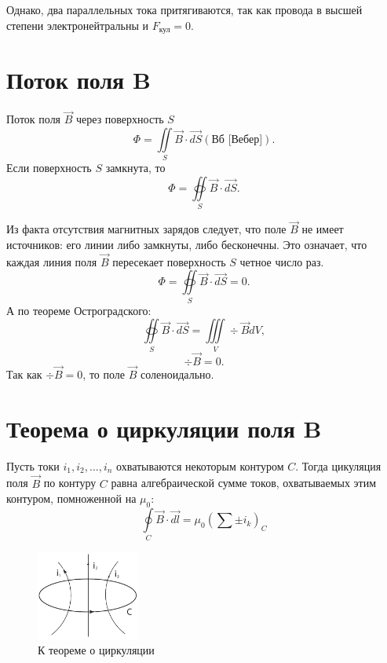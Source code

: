     Однако, два параллельных тока притягиваются, так как провода в высшей
    степени электронейтральны и \( F_\textit{кул} = 0 \).
    
\section{Поток поля \textbf{B}}
    Поток поля \( \vec{B} \) через поверхность \( S \)
    \[
        \Phi = \iint\limits_S \vec{B}\cdot\vec{dS} (\text{Вб [Вебер]}).
    \]
    Если поверхность \( S \) замкнута, то
    \[
        \Phi = \oiint\limits_S \vec{B}\cdot\vec{dS}.
    \]
    
    Из факта отсутствия магнитных зарядов следует, что поле \( \vec{B} \) не
    имеет источников: его линии либо замкнуты, либо бесконечны. Это означает,
    что каждая линия поля \( \vec{B} \) пересекает поверхность \( S \) четное
    число раз.
    \[
        \Phi = \oiint\limits_S \vec{B}\cdot\vec{dS} = 0.
    \]
    А по теореме Остроградского:
    \[
        \oiint\limits_S \vec{B}\cdot\vec{dS} = \iiint\limits_V \div\vec{B}dV,
    \]
    \[
        \div\vec{B} = 0.
    \]
     Так как \( \div\vec{B} = 0 \), то поле \( \vec{B} \) соленоидально.
     
\section{Теорема о циркуляции поля \textbf{B}}
    \begin{theorem}
        Пусть токи \( i_1, i_2, \ldots, i_n \) охватываются некоторым контуром
        \( C \). Тогда цикуляция поля \( \vec{B} \) по контуру \( C \) равна
        алгебраической сумме токов, охватываемых этим контуром, помноженной на
        \( \mu_0 \):
        \begin{equation}
            \oint\limits_C \vec{B}\cdot\vec{dl} = \mu_0 (\sum \pm i_k)_C
            \label{eq8:n1}
        \end{equation}
    \end{theorem}

    \begin{figure}[!b]
        \center
        \includegraphics[width=0.3\textwidth]{lec08/circulation_B.pdf} 
        \caption{К теореме о циркуляции}
        \label{fig:circulation_B}
    \end{figure}
    

